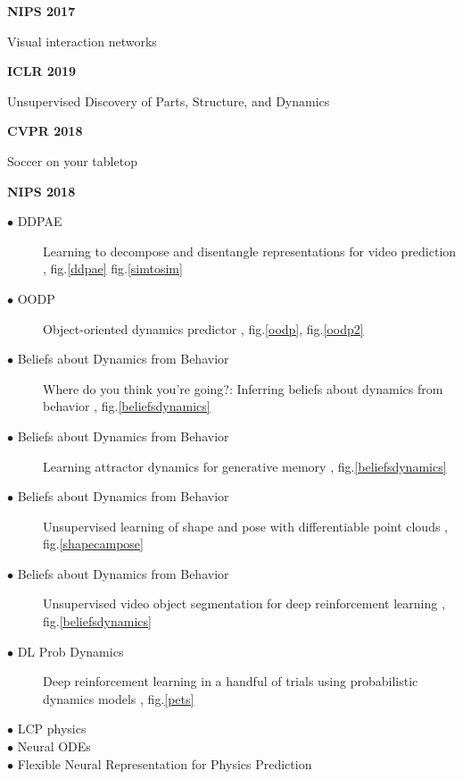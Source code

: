 \documentclass[12pt]{article}
\begin{document}
\textbf{NIPS 2017}

Visual interaction networks \cite{watters2017visual}



\textbf{ICLR 2019}

Unsupervised Discovery of Parts, Structure, and Dynamics
\cite{xu2019unsupervised}

\textbf{CVPR 2018}

Soccer on your tabletop \cite{rematas2018soccer}



 {\LARGE\noindent\textbf{NIPS 2018}}
\begin{description}
  \item[$\bullet$ DDPAE] Learning to decompose and disentangle representations
    for video prediction \cite{hsieh2018learning}, fig.\ref{ddpae}
fig.\ref{simtosim}
\item[$\bullet$ OODP] Object-oriented dynamics predictor
  \cite{kanazawa_2019_cvpr}, fig.\ref{oodp}, fig.\ref{oodp2}
\item[$\bullet$ Beliefs about Dynamics from Behavior] Where do you think you're going?: Inferring beliefs about dynamics from behavior \cite{reddy2018you}, fig.\ref{beliefsdynamics}
\item[$\bullet$ Beliefs about Dynamics from Behavior] Learning attractor dynamics for generative memory \cite{wu2018learning}, fig.\ref{beliefsdynamics}

\item[$\bullet$ Beliefs about Dynamics from Behavior] Unsupervised learning of shape and pose with differentiable point clouds \cite{insafutdinov2018unsupervised}, fig.\ref{shapecampose}

\item[$\bullet$ Beliefs about Dynamics from Behavior] Unsupervised video object segmentation for deep reinforcement learning \cite{goel2018unsupervised}, fig.\ref{beliefsdynamics}


\item[$\bullet$ DL Prob Dynamics] Deep reinforcement learning in a handful of trials using probabilistic dynamics models \cite{chua2018deep}, fig.\ref{pets}
  
\item[$\bullet$ LCP physics \cite{de2018end}]

\item[$\bullet$ Neural ODEs \cite{chen2018neural}]

\item[$\bullet$ Flexible Neural Representation for Physics Prediction \cite{mrowca2018flexible}]


\end{description}
\end{document}

